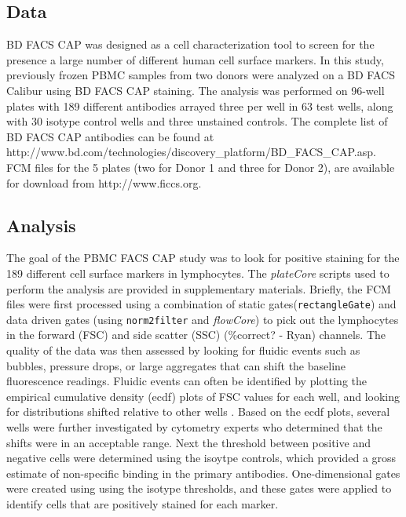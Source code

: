 \documentclass[12pt]{article}
\newcommand{\Robject}[1]{{\texttt{#1}}}
\newcommand{\Rpackage}[1]{{\textit{#1}}}
\begin{document}
\subsection*{Data}

BD FACS CAP was designed as a cell characterization tool to screen for the
presence a large number of different human cell surface markers. In this study,
previously frozen PBMC samples  from two donors were analyzed on a BD FACS
Calibur using BD FACS CAP staining. The analysis was performed on 96-well
plates with 189 different antibodies arrayed three per well in 63 test wells,
along with 30 isotype control wells and three unstained controls. The complete
list of BD FACS CAP antibodies can be found at
http://www.bd.com/technologies/discovery\_platform/BD\_FACS\_CAP.asp. FCM files
for the 5 plates (two for Donor 1 and three for Donor 2), are available for
download from http://www.ficcs.org.

\subsection*{Analysis}

The goal of the PBMC FACS CAP study was to look for positive staining for the
189 different cell surface markers in lymphocytes. The \Rpackage{plateCore}
scripts used to perform the analysis are provided in supplementary materials.
Briefly, the FCM files were first processed using a combination of static
gates(\Robject{rectangleGate}) and data driven gates (using
\Robject{norm2filter} and \Rpackage{flowCore}) to pick out the lymphocytes in
the forward (FSC) and side scatter (SSC) (\%correct? - Ryan) channels.  The
quality of the data was then assessed by looking for fluidic events such as
bubbles, pressure drops, or large aggregates that can shift the baseline
fluorescence readings. Fluidic events can often be identified by plotting the
empirical cumulative density (ecdf) plots of FSC values for each well, and
looking for distributions shifted relative to other wells \citep{lemeur2007}.
Based on the ecdf plots, several wells were further investigated by cytometry
experts who determined that the shifts were in an acceptable range. Next the
threshold between positive and negative cells were determined using the isoytpe
controls, which provided a gross estimate of non-specific binding in the
primary antibodies. One-dimensional gates were created using using the isotype
thresholds, and these gates were applied to identify cells that are positively
stained for each marker.
\end{document}
